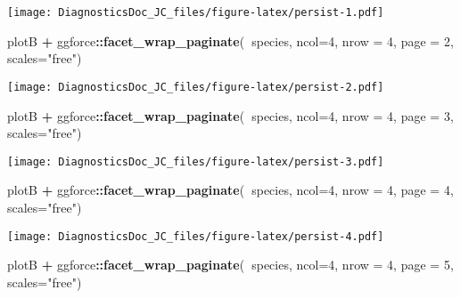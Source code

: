 \documentclass[
]{article}
\newenvironment{Shaded}{\begin{snugshade}}{\end{snugshade}}
\newcommand{\DataTypeTok}[1]{\textcolor[rgb]{0.13,0.29,0.53}{#1}}
\newcommand{\DecValTok}[1]{\textcolor[rgb]{0.00,0.00,0.81}{#1}}
\newcommand{\KeywordTok}[1]{\textcolor[rgb]{0.13,0.29,0.53}{\textbf{#1}}}
\newcommand{\NormalTok}[1]{#1}
\newcommand{\OperatorTok}[1]{\textcolor[rgb]{0.81,0.36,0.00}{\textbf{#1}}}
\newcommand{\StringTok}[1]{\textcolor[rgb]{0.31,0.60,0.02}{#1}}
\begin{document}
\texttt{[image: DiagnosticsDoc\_JC\_files/figure-latex/persist-1.pdf]}

\begin{Shaded}
\begin{Highlighting}[]
\NormalTok{plotB }\OperatorTok{+}\StringTok{ }\NormalTok{ggforce}\OperatorTok{::}\KeywordTok{facet_wrap_paginate}\NormalTok{(}\OperatorTok{~}\NormalTok{species, }\DataTypeTok{ncol=}\DecValTok{4}\NormalTok{, }\DataTypeTok{nrow =} \DecValTok{4}\NormalTok{, }\DataTypeTok{page =} \DecValTok{2}\NormalTok{, }\DataTypeTok{scales=}\StringTok{"free"}\NormalTok{) }
\end{Highlighting}
\end{Shaded}

\texttt{[image: DiagnosticsDoc\_JC\_files/figure-latex/persist-2.pdf]}

\begin{Shaded}
\begin{Highlighting}[]
\NormalTok{plotB }\OperatorTok{+}\StringTok{ }\NormalTok{ggforce}\OperatorTok{::}\KeywordTok{facet_wrap_paginate}\NormalTok{(}\OperatorTok{~}\NormalTok{species, }\DataTypeTok{ncol=}\DecValTok{4}\NormalTok{, }\DataTypeTok{nrow =} \DecValTok{4}\NormalTok{, }\DataTypeTok{page =} \DecValTok{3}\NormalTok{, }\DataTypeTok{scales=}\StringTok{"free"}\NormalTok{) }
\end{Highlighting}
\end{Shaded}

\texttt{[image: DiagnosticsDoc\_JC\_files/figure-latex/persist-3.pdf]}

\begin{Shaded}
\begin{Highlighting}[]
\NormalTok{plotB }\OperatorTok{+}\StringTok{ }\NormalTok{ggforce}\OperatorTok{::}\KeywordTok{facet_wrap_paginate}\NormalTok{(}\OperatorTok{~}\NormalTok{species, }\DataTypeTok{ncol=}\DecValTok{4}\NormalTok{, }\DataTypeTok{nrow =} \DecValTok{4}\NormalTok{, }\DataTypeTok{page =} \DecValTok{4}\NormalTok{, }\DataTypeTok{scales=}\StringTok{"free"}\NormalTok{) }
\end{Highlighting}
\end{Shaded}

\texttt{[image: DiagnosticsDoc\_JC\_files/figure-latex/persist-4.pdf]}

\begin{Shaded}
\begin{Highlighting}[]
\NormalTok{plotB }\OperatorTok{+}\StringTok{ }\NormalTok{ggforce}\OperatorTok{::}\KeywordTok{facet_wrap_paginate}\NormalTok{(}\OperatorTok{~}\NormalTok{species, }\DataTypeTok{ncol=}\DecValTok{4}\NormalTok{, }\DataTypeTok{nrow =} \DecValTok{4}\NormalTok{, }\DataTypeTok{page =} \DecValTok{5}\NormalTok{, }\DataTypeTok{scales=}\StringTok{"free"}\NormalTok{)}
\end{Highlighting}
\end{Shaded}
\end{document}
